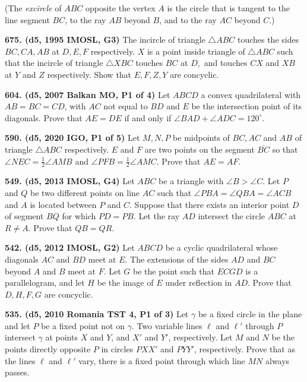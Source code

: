 \documentclass{article}
\begin{document}
(The \emph{excircle} of $ABC$ opposite the vertex $A$ is the circle that is tangent to the line segment $BC$, to the ray $AB$ beyond $B$, and to the ray $AC$ beyond $C$.)

\textbf{675. (\color{red}d5\color{black}, 1995 IMOSL, G3)} The incircle of triangle $\triangle A B C$ touches the sides $B C, C A, A B$ at $D, E, F$ respectively. $X$ is a point inside triangle of $\triangle A B C$ such that the incircle of triangle $\triangle X B C$ touches $B C$ at $D,$ and touches $C X$ and $X B$ at $Y$ and $Z$ respectively. Show that $E, F, Z, Y$ are concyclic.

\textbf{604. (\color{red}d5\color{black}, 2007 Balkan MO, P1 of 4)} Let $ABCD$ a convex quadrilateral with $AB=BC=CD$, with $AC$ not equal to $BD$ and $E$ be the intersection point of its diagonals. Prove that $AE=DE$ if and only if $\angle BAD+\angle ADC = 120^{\circ}$.

\textbf{590. (\color{red}d5\color{black}, 2020 IGO, P1 of 5)} Let $M,N,P$ be midpoints of $BC,AC$ and $AB$ of triangle $\triangle ABC$ respectively. $E$ and $F$ are two points on the segment $\overline{BC}$ so that $\angle NEC = \frac{1}{2} \angle AMB$ and $\angle PFB = \frac{1}{2} \angle AMC$. Prove that $AE=AF$.

\textbf{549. (\color{red}d5\color{black}, 2013 IMOSL, G4)} Let $ABC$ be a triangle with $\angle B > \angle C$. Let $P$ and $Q$ be two different points on line $AC$ such that $\angle PBA = \angle QBA = \angle ACB $ and $A$ is located between $P$ and $C$. Suppose that there exists an interior point $D$ of segment $BQ$ for which $PD=PB$. Let the ray $AD$ intersect the circle $ABC$ at $R \neq A$. Prove that $QB = QR$.

\textbf{542. (\color{red}d5\color{black}, 2012 IMOSL, G2)} Let $ABCD$ be a cyclic quadrilateral whose diagonals $AC$ and $BD$ meet at $E$. The extensions of the sides $AD$ and $BC$ beyond $A$ and $B$ meet at $F$. Let $G$ be the point such that $ECGD$ is a parallelogram, and let $H$ be the image of $E$ under reflection in $AD$. Prove that $D,H,F,G$ are concyclic.

\textbf{535. (\color{red}d5\color{black}, 2010 Romania TST 4, P1 of 3)} Let $\gamma$ be a fixed circle in the plane and let $P$ be a fixed point not on $\gamma$. Two variable lines $\ell$ and $\ell'$ through $P$ intersect $\gamma$ at points $X$ and $Y$, and $X'$ and $Y'$, respectively. Let $M$ and $N$ be the points directly opposite $P$ in circles $PXX'$ and $PY Y'$, respectively. Prove that as the lines $\ell$ and $\ell'$ vary, there is a fixed point through which line $MN$ always passes.
\end{document}
